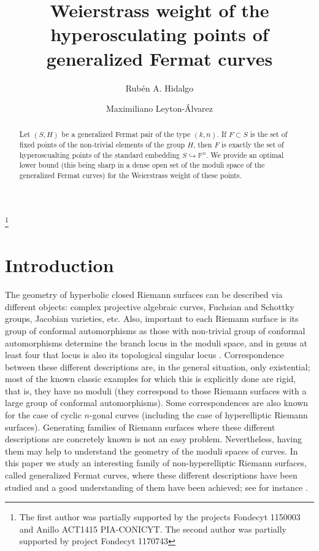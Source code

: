 \documentclass{amsart}
\begin{document}
\title[Weierstrass weight of the hyperosculating points]{Weierstrass weight of the hyperosculating points of generalized Fermat curves}


\author[R. A. Hidalgo]{Rub\'en A. Hidalgo}
\address{Departamento de Matem\'atica y Estad\'istica, Universidad de la Frontera, Temuco, Chile}

\author[M. Leyton-\'Alvarez]{Maximiliano Leyton-\'Alvarez}
\address{Instituto de Matem\'atica y F\'isica, Universidad de Talca, Talca, Chile}


\thanks{The first author was partially supported by the projects
 Fondecyt 1150003 and Anillo ACT1415 PIA-CONICYT.
The second author was partially supported by project Fondecyt 1170743}
\maketitle


\begin{abstract}
Let $(S,H)$ be a generalized Fermat pair of the type $(k,n)$. If $F\subset S$ 
is the set of  fixed points of the non-trivial elements of the group $H$, then $F$ is exactly 
the set of hyperoscualting points of the standard embedding $S\hookrightarrow {\mathbb{P}}^{n}$. We provide an  optimal lower bound (this being sharp in
a dense open set  of  the moduli space of the generalized Fermat curves) for the Weierstrass weight of these points.
\end{abstract}

\section{Introduction}
The geometry of hyperbolic closed Riemann surfaces can be described via different objects: complex 
projective algebraic curves,  Fuchsian and Schottky groups, Jacobian varieties, etc. Also, important to each 
Riemann surface is its group of conformal automorphisms as those with non-trivial group of conformal automorphisms 
determine the branch locus in the moduli space,
and in genus at least four that locus is also its topological singular locus \cite{Rauch}.
Correspondence between these different descriptions are, in the general situation, only existential; most of the known classic examples for which this is explicitly done are rigid, that is, they have no moduli (they correspond to those Riemann surfaces with a large group of conformal automorphisms).  Some correspondences are also known for the case of cyclic $n$-gonal curves (including the case of hyperelliptic Riemann surfaces).  Generating families of Riemann surfaces  where these different descriptions are concretely known is not an easy problem. 
Nevertheless, having them may help to understand the geometry of the moduli spaces of  curves.  In this paper we study an interesting family of non-hyperelliptic Riemann surfaces,  called generalized Fermat curves, where these different descriptions have been studied  and a good understanding of them have been achieved; see for instance \cite{CHQ15, FGHL13,GHL09,HKLP16}.
\end{document}
